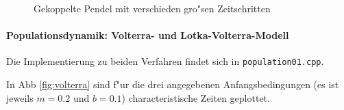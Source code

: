 \documentclass[a4paper,12pt]{article}
\begin{document}
\begin{figure}
  \caption{Gekoppelte Pendel mit verschieden gro"sen Zeitschritten}
  \label{fig:vgl-schritte}
\end{figure}






\paragraph{Populationsdynamik: Volterra- und Lotka-Volterra-Modell}
\label{sec:popul_volt_und_lotka_volt}

Die Implementierung zu beiden Verfahren findet sich in
\texttt{population01.cpp}.

In Abb \ref{fig:volterra} sind f"ur die drei angegebenen
Anfangsbedingungen (es ist jeweils $m = 0.2$ und $b = 0.1$)
characteristische Zeiten geplottet.
\end{document}
